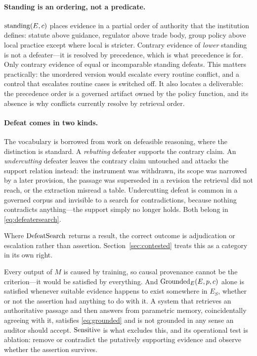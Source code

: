 \paragraph{Standing is an ordering, not a predicate.} $\operatorname{standing}(E, c)$ places evidence
in a partial order of authority that the institution defines: statute above guidance,
regulator above trade body, group policy above local practice except where local is
stricter. Contrary evidence of \emph{lower} standing is not a defeater---it is resolved
by precedence, which is what precedence is for. Only contrary evidence of equal or
incomparable standing defeats. This matters practically: the unordered version would
escalate every routine conflict, and a control that escalates routine cases is switched
off. It also locates a deliverable: the precedence order is a governed artifact owned by
the policy function, and its absence is why conflicts currently resolve by retrieval
order.

\paragraph{Defeat comes in two kinds.} The vocabulary is borrowed from work on
defeasible reasoning, where the distinction is standard. A \emph{rebutting} defeater
supports the contrary claim. An \emph{undercutting} defeater leaves the contrary claim
untouched and attacks the support relation instead: the instrument was withdrawn, its
scope was narrowed by a later provision, the passage was superseded in a revision the
retrieval did not reach, or the extraction misread a table. Undercutting defeat is
common in a governed corpus and invisible to a search for contradictions, because
nothing contradicts anything---the support simply no longer holds. Both belong in
\eqref{eq:defeatersearch}.

Where $\operatorname{DefeatSearch}$ returns a result, the correct outcome is adjudication or
escalation rather than assertion. Section~\ref{sec:contested} treats this as a category
in its own right.

Every output of $M$ is caused by training, so causal provenance cannot be the
criterion---it would be satisfied by everything. And $\operatorname{Grounded}_{E}(E, p, c)$ alone is
satisfied whenever suitable evidence happens to exist somewhere in $E_S$, whether
or not the assertion had anything to do with it. A system that retrieves an
authoritative passage and then answers from parametric memory, coincidentally
agreeing with it, satisfies \eqref{eq:grounded} and is not grounded in any sense
an auditor should accept. $\operatorname{Sensitive}$ is what excludes this, and its operational
test is ablation: remove or contradict the putatively supporting evidence and
observe whether the assertion survives.

